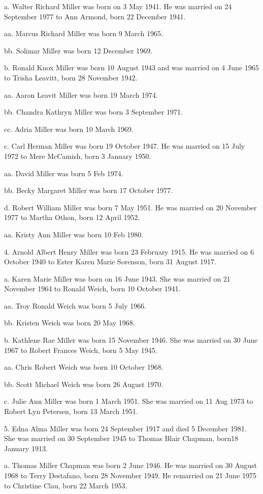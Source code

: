 \documentclass[a4paper]{article}
\begin{document}
a. Walter Richard Miller was born on 3 May 1941.  He was married on 24 September 1977 to Ann Armond, born 22 December 1941.

aa. Marcus Richard Miller was born 9 March 1965.

bb. Solimar Miller was born 12 December 1969.

b. Ronald Knox Miller was born 10 August 1943 and was married on 4 June 1965 to Trisha Leavitt, born 28 November 1942.

aa. Aaron Leavit Miller was born 19 March 1974.

bb. Chandra Kathryn Miller was born 3 September 1971.

cc. Adria Miller was born 10 March 1969.

c. Carl Herman Miller was born 19 October 1947.  He was married on 15 July 1972 to Mere McCamish, born 3 January 1950.

aa. David Miller was born 5 Feb 1974.

bb. Becky Margaret Miller was born 17 October 1977.

d. Robert William Miller was born 7 May 1951.  He was married on 20 November 1977 to Martha Othon, born 12 April 1952.
 
aa.  Kristy Ann Miller was born 10 Feb 1980.

4. Arnold Albert Henry Miller was born 23 February 1915.  He was married on 6 October 1940 to Ester Karen Marie Sorenson, born 31 August 1917.

a. Karen Marie Miller was born on 16 June 1943.  She was married on 21 November 1964 to Ronald Weich, born 10 October 1941.
 
aa. Troy Ronald Weich was born 5 July 1966.

bb. Kristen Weich was born 20 May 1968.

b. Kathlene Rae Miller  was born 15 November 1946.  She was married on 30 June 1967 to Robert Frances Weich, born 5 May 1945.
 
aa. Chris Robert Weich was born 10 October 1968.

bb. Scott Michael Weich was born 26 August 1970.

c. Julie Ann Miller was born 1 March 1951.  She was married on 11 Aug 1973 to Robert Lyn Petersen, born 13 March 1951.
 
5. Edna Alma Miller was born 24 September 1917 and died 5 December 1981. She was married on 30 September 1945 to Thomas Blair Chapman, born18 January 1913.
 
a. Thomas Miller Chapman was born 2 June 1946.  He was married on 30 August 1968 to Terry Destafano, born 28 November 1949.  He remarried on 21 June 1975 to Christine Clau, born 22 March 1953.  
			
\end{document}
